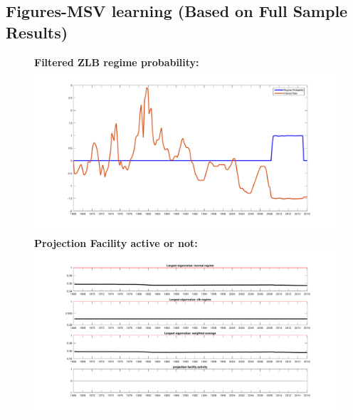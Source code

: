 \documentclass[12pt,reqno]{article}
\numberwithin{equation}{section}
\begin{document}
\subsection*{Figures-MSV learning (Based on Full Sample Results)}
\begin{figure}[H]
\textbf{Filtered ZLB regime probability:}\\
\includegraphics[scale=0.5]{sw_msv_regimeProb.pdf}\\
\textbf{Projection Facility active or not:}\\
\includegraphics[scale=0.5]{sw_msv_eigenvalues.pdf}
\end{figure}
\end{document}
